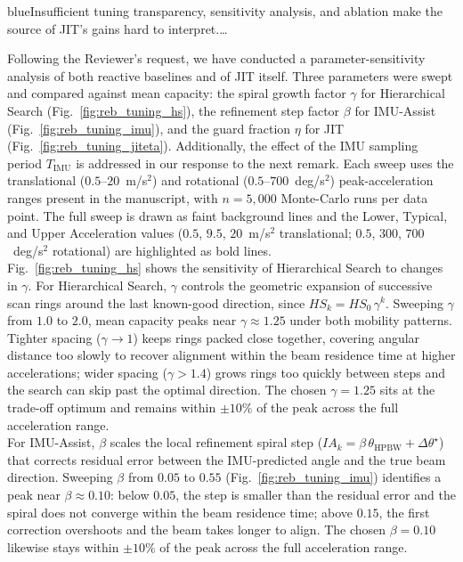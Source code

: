 \documentclass{article}
\newcommand{\blue}[1]{\begin{color}{blue}#1\end{color}}
\begin{document}
\begin{tcbremark}
{\selectfont
\blue{Insufficient tuning transparency, sensitivity analysis, and ablation make the source of JIT's gains hard to interpret.\dots}
}
\end{tcbremark}

\noindent Following the Reviewer's request, we have conducted a parameter-sensitivity analysis of both reactive baselines and of JIT itself. Three parameters were swept and compared against mean capacity: the spiral growth factor $\gamma$ for Hierarchical Search (Fig.~\ref{fig:reb_tuning_hs}), the refinement step factor $\beta$ for IMU-Assist (Fig.~\ref{fig:reb_tuning_imu}), and the guard fraction $\eta$ for JIT (Fig.~\ref{fig:reb_tuning_jiteta}). Additionally, the effect of the IMU sampling period $T_{\text{IMU}}$ is addressed in our response to the next remark. Each sweep uses the translational ($0.5$--$20$~m/s$^2$) and rotational ($0.5$--$700$~deg/s$^2$) peak-acceleration ranges present in the manuscript, with $n = 5{,}000$ Monte-Carlo runs per data point. The full sweep is drawn as faint background lines and the Lower, Typical, and Upper Acceleration values ($0.5$, $9.5$, $20$~m/s$^2$ translational; $0.5$, $300$, $700$~deg/s$^2$ rotational) are highlighted as bold lines.\\

\noindent Fig.~\ref{fig:reb_tuning_hs} shows the sensitivity of Hierarchical Search to changes in $\gamma$. For Hierarchical Search, $\gamma$ controls the geometric expansion of successive scan rings around the last known-good direction, since $HS_k = HS_0\,\gamma^k$. Sweeping $\gamma$ from $1.0$ to $2.0$, mean capacity peaks near $\gamma \approx 1.25$ under both mobility patterns. Tighter spacing ($\gamma \to 1$) keeps rings packed close together, covering angular distance too slowly to recover alignment within the beam residence time at higher accelerations; wider spacing ($\gamma > 1.4$) grows rings too quickly between steps and the search can skip past the optimal direction. The chosen $\gamma = 1.25$ sits at the trade-off optimum and remains within $\pm 10\%$ of the peak across the full acceleration range.\\

\noindent For IMU-Assist, $\beta$ scales the local refinement spiral step ($IA_k = \beta\,\theta_{\text{HPBW}} + \Delta\theta^{\star}$) that corrects residual error between the IMU-predicted angle and the true beam direction. Sweeping $\beta$ from $0.05$ to $0.55$ (Fig.~\ref{fig:reb_tuning_imu}) identifies a peak near $\beta \approx 0.10$: below $0.05$, the step is smaller than the residual error and the spiral does not converge within the beam residence time; above $0.15$, the first correction overshoots and the beam takes longer to align. The chosen $\beta = 0.10$ likewise stays within $\pm 10\%$ of the peak across the full acceleration range.\\
\end{document}
